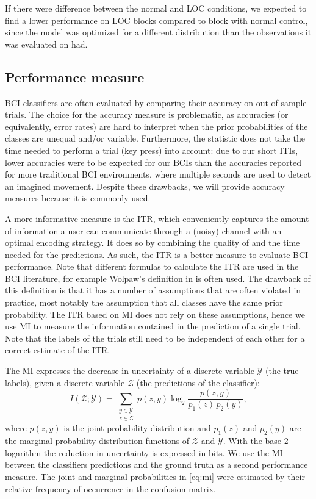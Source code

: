If there were difference between the normal and \ac{LOC} conditions, we
expected to find a lower performance on \ac{LOC} blocks compared to block with
normal control, since the model was optimized for a different distribution than
the observations it was evaluated on had.

\subsection{Performance measure}
\ac{BCI} classifiers are often evaluated by comparing their accuracy on
out-of-sample trials. The choice for the accuracy measure is problematic, as
accuracies (or equivalently, error rates) are hard to interpret when the prior
probabilities of the classes are unequal and/or variable. Furthermore, the
statistic does not take the time needed to perform a trial (key press) into
account: due to our short \acp{ITI}, lower accuracies were to be expected for
our \acp{BCI} than the accuracies reported for more traditional \ac{BCI}
environments, where multiple seconds are used to detect an imagined movement.
Despite these drawbacks, we will provide accuracy measures because it is
commonly used.

\begin{sloppypar}
A more informative measure is the \ac{ITR}, which conveniently captures the
amount of information a user can communicate through a (noisy) channel with an
optimal encoding strategy. It does so by combining the quality of and the time
needed for the predictions. As such, the \ac{ITR} is a better measure to
evaluate \ac{BCI} performance.
%
Note that different formulas to calculate the \ac{ITR} are used in the \ac{BCI}
literature, for example Wolpaw's definition in \cite{wolpaw2002bci} is often
used. The drawback of this definition is that it has a number of assumptions
that are often violated in practice, most notably the assumption that all
classes have the same prior probability. The \ac{ITR} based on \ac{MI} does not
rely on these assumptions, hence we use \ac{MI} to measure the information
contained in the prediction of a single trial. Note that the labels of the
trials still need to be independent of each other for a correct estimate of the
\ac{ITR}.
\end{sloppypar}

The \Ac{MI} expresses the decrease in uncertainty of a discrete variable
$\mathcal{Y}$ (the true labels), given a discrete variable $\mathcal{Z}$ (the
predictions of the classifier):
%
\begin{equation} \label{eq:mi} I(\mathcal{Z}; \mathcal{Y}) = \sum_{\substack{y
\in \mathcal{Y}\\z \in \mathcal{Z}}} p(z, y) \log_2{\frac{p(z,
y)}{p_1(z)\,p_2(y)}}, \end{equation}
%
where $p(z, y)$ is the joint probability distribution and $p_1(z)$ and $p_2(y)$
are the marginal probability distribution functions of $\mathcal{Z}$ and
$\mathcal{Y}$. With the base-2 logarithm the reduction in uncertainty is
expressed in bits. We use the \ac{MI} between the classifiers predictions and
the ground truth as a second performance measure. The joint and marginal
probabilities in \eqref{eq:mi} were estimated by their relative frequency of
occurrence in the confusion matrix.

